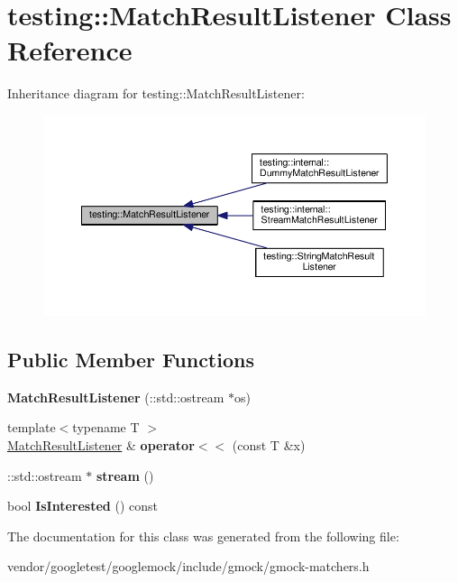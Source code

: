 \hypertarget{classtesting_1_1MatchResultListener}{}\section{testing\+:\+:Match\+Result\+Listener Class Reference}
\label{classtesting_1_1MatchResultListener}


Inheritance diagram for testing\+:\+:Match\+Result\+Listener\+:\nopagebreak
\begin{figure}[H]
\begin{center}
\leavevmode
\includegraphics[width=350pt]{classtesting_1_1MatchResultListener__inherit__graph}
\end{center}
\end{figure}
\subsection*{Public Member Functions}
\begin{DoxyCompactItemize}
\item 
{\bfseries Match\+Result\+Listener} (\+::std\+::ostream $\ast$os)\hypertarget{classtesting_1_1MatchResultListener_a245c360286cd0496d22a4d2fde80eb0b}{}\label{classtesting_1_1MatchResultListener_a245c360286cd0496d22a4d2fde80eb0b}

\item 
{\footnotesize template$<$typename T $>$ }\\\hyperlink{classtesting_1_1MatchResultListener}{Match\+Result\+Listener} \& {\bfseries operator$<$$<$} (const T \&x)\hypertarget{classtesting_1_1MatchResultListener_a89f628a452635d1502a9062d9c864ebd}{}\label{classtesting_1_1MatchResultListener_a89f628a452635d1502a9062d9c864ebd}

\item 
\+::std\+::ostream $\ast$ {\bfseries stream} ()\hypertarget{classtesting_1_1MatchResultListener_a5abecb247e005f7f50a94898e3f44ee3}{}\label{classtesting_1_1MatchResultListener_a5abecb247e005f7f50a94898e3f44ee3}

\item 
bool {\bfseries Is\+Interested} () const \hypertarget{classtesting_1_1MatchResultListener_a68dc4f2f3c3425f4d4dd90ab02244615}{}\label{classtesting_1_1MatchResultListener_a68dc4f2f3c3425f4d4dd90ab02244615}

\end{DoxyCompactItemize}


The documentation for this class was generated from the following file\+:\begin{DoxyCompactItemize}
\item 
vendor/googletest/googlemock/include/gmock/gmock-\/matchers.\+h\end{DoxyCompactItemize}
